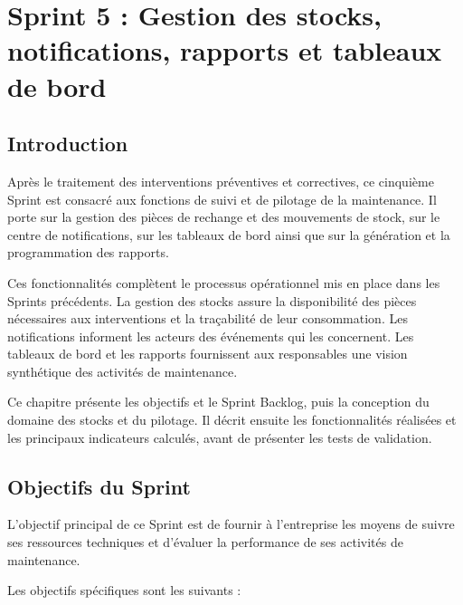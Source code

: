 \section{Sprint 5 : Gestion des stocks, notifications, rapports et tableaux de bord}

\subsection{Introduction}

Après le traitement des interventions préventives et correctives, ce cinquième Sprint est consacré aux fonctions de suivi et de pilotage de la maintenance. Il porte sur la gestion des pièces de rechange et des mouvements de stock, sur le centre de notifications, sur les tableaux de bord ainsi que sur la génération et la programmation des rapports.

{\sloppy
Ces fonctionnalités complètent le processus opérationnel mis en place dans les Sprints précédents. La gestion des stocks assure la disponibilité des pièces nécessaires aux interventions et la traçabilité de leur consommation. Les notifications informent les acteurs des événements qui les concernent. Les tableaux de bord et les rapports fournissent aux responsables une vision synthétique des activités de maintenance.
\par}

Ce chapitre présente les objectifs et le Sprint Backlog, puis la conception du domaine des stocks et du pilotage. Il décrit ensuite les fonctionnalités réalisées et les principaux indicateurs calculés, avant de présenter les tests de validation.

\subsection{Objectifs du Sprint}

L'objectif principal de ce Sprint est de fournir à l'entreprise les moyens de suivre ses ressources techniques et d'évaluer la performance de ses activités de maintenance.

Les objectifs spécifiques sont les suivants :

